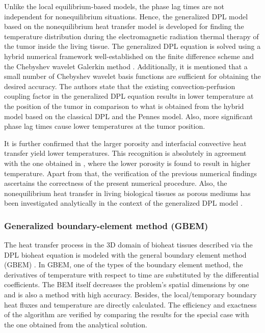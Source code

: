 \documentclass[sn-mathphys]{sn-jnl}%
\theoremstyle{thmstyleone}%
\theoremstyle{thmstyletwo}%
\theoremstyle{thmstylethree}%
\begin{document}
{Unlike the local equilibrium-based models, the phase lag times are not independent for nonequilibrium situations. Hence, the generalized DPL model based on the nonequilibrium heat transfer model is developed for finding the temperature distribution during the electromagnetic radiation thermal therapy of the tumor inside the living tissue. The generalized DPL equation is solved using a hybrid numerical framework well-established on the finite difference scheme and the Chebyshev wavelet Galerkin method \cite{PKumar2019}. Additionally, it is mentioned that a small number of Chebyshev wavelet basis functions are sufficient for obtaining the desired accuracy. The authors state that the existing convection-perfusion coupling factor in the generalized DPL equation results in lower temperature at the position of the tumor in comparison to what is obtained from the hybrid model based on the classical DPL and the Pennes model. Also, more significant phase lag times cause lower temperatures at the tumor position.

It is further confirmed that the larger porosity and interfacial convective heat transfer yield lower temperatures. This recognition is absolutely in agreement with the one obtained in \cite{MJasinski2016}, where the lower porosity is found to result in higher temperature. Apart from that, the verification of the previous numerical findings ascertains the correctness of the present numerical procedure. Also, the nonequilibrium heat transfer in living biological tissues as porous mediums has been investigated analytically in the context of the generalized DPL model \cite{HAskarizadeh2015,Kaluza2017}.

\subsubsection{Generalized boundary-element method (GBEM)}
The heat transfer process in the 3D domain of bioheat tissues described via the DPL bioheat equation is modeled with the general boundary element method (GBEM) \cite{Majchrzak2015}. In GBEM, one of the types of the boundary element method, the derivatives of temperature with respect to time are substituted by the differential coefficients. The BEM itself decreases the problem's spatial dimensions by one and is also a method with high accuracy. Besides, the local/temporary boundary heat fluxes and temperature are directly calculated. The efficiency and exactness of the algorithm are verified by comparing the results for the special case with the one obtained from the analytical solution.

}
\end{document}
